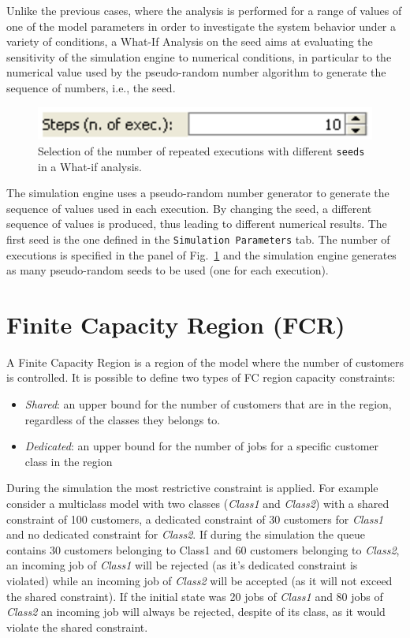 \begin{itemize}
Unlike the previous cases, where the analysis is performed for a
range of values of one of the model parameters in order to
investigate the system behavior under a variety of conditions, a
What-If Analysis on the seed aims at evaluating the sensitivity of
the simulation engine to numerical conditions, in particular to
the numerical value used by the pseudo-random number algorithm to
generate the sequence of numbers, i.e., the seed.
\begin{figure}[hbt]
    \begin{center}
        \includegraphics[scale=.5]{img/jsimg/7.7.eps}
    \end{center}
    \caption{Selection of the number of repeated executions with
    different \texttt{seeds} in a What-if analysis.}
    \label{fig:selseed}
\end{figure}
The simulation engine uses a pseudo-random number generator to
generate the sequence of values used in each execution. By
changing the seed, a different sequence of values is produced,
thus leading to different numerical results. The first seed is the
one defined in the \texttt{Simulation Parameters} tab. The number
of executions is specified in the panel of Fig.~\ref{fig:selseed}
and the simulation engine generates as many pseudo-random seeds to
be used (one for each execution).
\end{itemize}

\section{Finite Capacity Region (FCR)}
\label{defcap}


A Finite Capacity Region is a region of the model where the number
of customers is controlled. It is possible to define two types of
FC region capacity constraints:
\begin{itemize}
\item \emph{Shared}: an upper bound for the number of customers
that are in the region, regardless of the classes they belongs to.
\item \emph{Dedicated}: an upper bound for the number of jobs for
a specific customer class in the region
\end{itemize}
During the simulation the most restrictive constraint is applied.
For example consider a multiclass model with two classes
(\emph{Class1} and \emph{Class2}) with a shared constraint of 100
customers, a dedicated constraint of 30 customers for
\emph{Class1} and no dedicated constraint for \emph{Class2}. If
during the simulation the queue contains 30 customers belonging to
Class1 and 60 customers belonging to \emph{Class2}, an incoming
job of \emph{Class1} will be rejected (as it's dedicated
constraint is violated) while an incoming job of \emph{Class2}
will be accepted (as it will not exceed the shared constraint). If
the initial state was 20 jobs of \emph{Class1} and 80 jobs of
\emph{Class2} an incoming job will always be rejected, despite of
its class, as it would violate the shared constraint.\\


